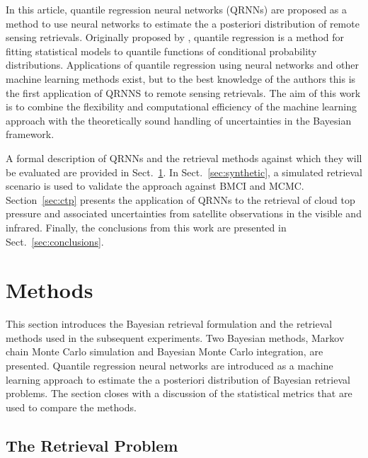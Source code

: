 \documentclass[journal abbreviation, manuscript]{copernicus}
\begin{document}
In this article, quantile regression neural networks (QRNNs) are proposed as a
method to use neural networks to estimate the a posteriori distribution of
remote sensing retrievals. Originally proposed by \citet{koenker_bassett},
quantile regression is a method for fitting statistical models to quantile
functions of conditional probability distributions. Applications of quantile
regression using neural networks \citep{cannon} and other machine learning
methods \citep{meinshausen} exist, but to the best knowledge of the authors this
is the first application of QRNNS to remote sensing retrievals. The aim of this
work is to combine the flexibility and computational efficiency of the machine
learning approach with the theoretically sound handling of uncertainties in the
Bayesian framework.

A formal description of QRNNs and the retrieval methods against which they will
be evaluated are provided in Sect.~\ref{sec:methods}. In
Sect.~\ref{sec:synthetic}, a simulated retrieval scenario is used to validate
the approach against BMCI and MCMC. Section~\ref{sec:ctp} presents the
application of QRNNs to the retrieval of cloud top pressure and associated
uncertainties from satellite observations in the visible and infrared. Finally,
the conclusions from this work are presented in Sect.~\ref{sec:conclusions}.

\section{Methods}
\label{sec:methods}

This section introduces the Bayesian retrieval formulation and the retrieval
methods used in the subsequent experiments. Two Bayesian methods, Markov chain
Monte Carlo simulation and Bayesian Monte Carlo integration, are presented.
Quantile regression neural networks are introduced as a machine learning
approach to estimate the a posteriori distribution of Bayesian retrieval
problems. The section closes with a discussion of the statistical metrics that
are used to compare the methods.

\subsection{The Retrieval Problem}
\end{document}
